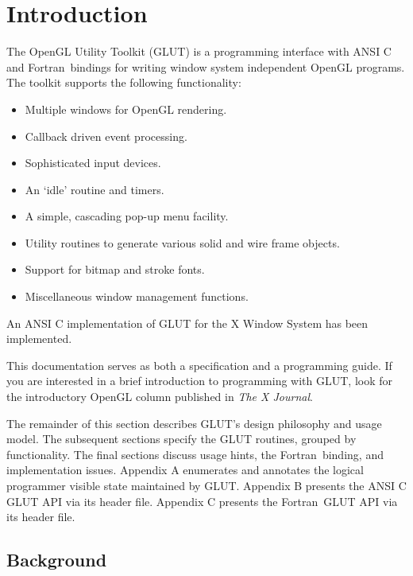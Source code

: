 \newpage

\tableofcontents

\cleardoublepage



\section{Introduction}

\def\Fortran{{\sc Fortran}}

The OpenGL Utility Toolkit (GLUT) is a programming interface with ANSI C and
\Fortran\ bindings for writing window system
independent OpenGL programs.  The toolkit supports the following functionality:
\begin{itemize}
\item Multiple windows for OpenGL rendering.
\item Callback driven event processing.
\item Sophisticated input devices.
\item An `idle' routine and timers.
\item A simple, cascading pop-up menu facility.
\item Utility routines to generate various solid and wire frame objects.
\item Support for bitmap and stroke fonts.
\item Miscellaneous window management functions.
\end{itemize}
An ANSI C implementation of GLUT for the X Window System \cite{x92} has
been implemented.

This documentation serves as both a specification and a programming guide.
If you are interested in a brief introduction to programming with GLUT,
look for the introductory OpenGL column \cite{kilgard94c}
published in {\em The X Journal}.

The remainder of this section describes GLUT's design philosophy and usage model.
The subsequent sections specify the GLUT routines, grouped by functionality.
The final sections discuss usage hints, the \Fortran\ binding, and implementation issues.
Appendix A enumerates and annotates the logical programmer visible state maintained by GLUT.
Appendix B presents the ANSI C GLUT API via its header file.
Appendix C presents the \Fortran\ GLUT API via its header file.

\subsection{Background}


